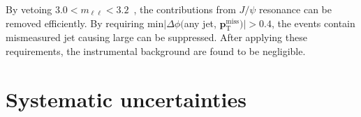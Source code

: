 By vetoing $3.0 < m_{\ell \ell} < 3.2$~{\GeV}, the contributions from $J/\psi$ resonance can be removed efficiently.
By requiring min$|\Delta \phi($any jet, $\mathbf{p}^{\mathrm{miss}}_{\mathrm{T}})| > 0.4$, the events contain mismeasured jet causing large \met can be suppressed.
After applying these requirements, the instrumental \met background are found to be negligible.


\section{Systematic uncertainties}
\label{sec:bkg_systematic_uncertainties}


